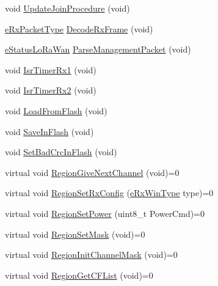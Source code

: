 \begin{DoxyCompactItemize}
\item 
void \mbox{\hyperlink{class_lora_wan_container_a4e3a03ff91ae1ebca993206fc9d18c2d}{Update\+Join\+Procedure}} (void)
\item 
\mbox{\hyperlink{_define_8h_ac1b1454c99671113bca600652e09e8bd}{e\+Rx\+Packet\+Type}} \mbox{\hyperlink{class_lora_wan_container_a757fc71b5986280b6702febbf7bd87f3}{Decode\+Rx\+Frame}} (void)
\item 
\mbox{\hyperlink{_define_8h_a1cea710adbbf5b02bced8f79cd82f7b9}{e\+Status\+Lo\+Ra\+Wan}} \mbox{\hyperlink{class_lora_wan_container_a8b040b7c680d7fa3998a37cb462c74f7}{Parse\+Management\+Packet}} (void)
\item 
void \mbox{\hyperlink{class_lora_wan_container_a0c319cd6644631008aaa3e600e66d2a4}{Isr\+Timer\+Rx1}} (void)
\item 
void \mbox{\hyperlink{class_lora_wan_container_a787bbbf8efd3d85e2938c0bf46b22bfd}{Isr\+Timer\+Rx2}} (void)
\item 
void \mbox{\hyperlink{class_lora_wan_container_abc16aeda3958e34b81e72752e6331be3}{Load\+From\+Flash}} (void)
\item 
void \mbox{\hyperlink{class_lora_wan_container_a91e8c03b02a6672fe5f0342129618bb3}{Save\+In\+Flash}} (void)
\item 
void \mbox{\hyperlink{class_lora_wan_container_a488791458e4b9098607d2f502da9d633}{Set\+Bad\+Crc\+In\+Flash}} (void)
\item 
virtual void \mbox{\hyperlink{class_lora_wan_container_a3ced7ed5217292b17d3f554fdc12c45e}{Region\+Give\+Next\+Channel}} (void)=0
\item 
virtual void \mbox{\hyperlink{class_lora_wan_container_a6d9c6a90a373153f95897951b877d826}{Region\+Set\+Rx\+Config}} (\mbox{\hyperlink{_define_8h_ab894a4c21b8aae9e9c68d8c426a66956}{e\+Rx\+Win\+Type}} type)=0
\item 
virtual void \mbox{\hyperlink{class_lora_wan_container_a6f489634d893e32270ded4b471f93080}{Region\+Set\+Power}} (uint8\+\_\+t Power\+Cmd)=0
\item 
virtual void \mbox{\hyperlink{class_lora_wan_container_a1256cfca2973d3cb9114a3f25dfa9aca}{Region\+Set\+Mask}} (void)=0
\item 
virtual void \mbox{\hyperlink{class_lora_wan_container_aeacbb5b9a6ca06708c095c2f67aae93e}{Region\+Init\+Channel\+Mask}} (void)=0
\item 
virtual void \mbox{\hyperlink{class_lora_wan_container_a6603ef368fea1cf2d1e4de2120c1dff6}{Region\+Get\+C\+F\+List}} (void)=0
\item 

\end{DoxyCompactItemize}
